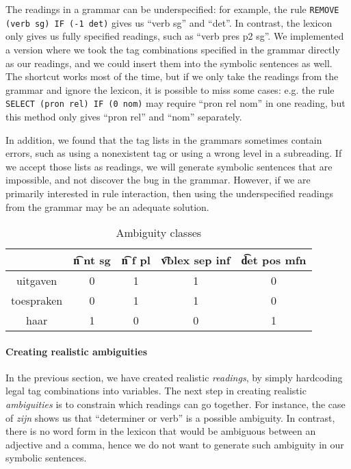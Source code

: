 {{The readings in a grammar can be underspecified: for example, the rule
\texttt{REMOVE (verb sg) IF (-1 det)} gives us ``verb sg'' and ``det''.
In contrast, the lexicon only gives us fully specified readings, such
as ``verb pres p2 sg''. We implemented a version where we took
the tag combinations specified in the grammar directly as our
readings, and we could insert them into the symbolic sentences as well.
The shortcut works most of the time, but if we only take the readings
from the grammar and ignore the lexicon, it is possible to
miss some cases: e.g. the rule \texttt{SELECT (pron rel) IF (0 nom)} 
may require ``pron rel nom'' in one reading, but this method only gives
``pron rel'' and ``nom'' separately. 


In addition, we found that the tag lists in the grammars sometimes
contain errors, such as using a nonexistent tag or using a wrong level
in a subreading. If we accept those lists as readings, we will
generate symbolic sentences that are impossible, and not discover
the bug in the grammar.
However, if we are primarily interested in rule interaction, then using
the underspecified readings from the grammar may be an adequate solution.



\begin{table}[h]
\centering
\begin{tabular}{ c|c|c|c|c}
             & \t{n nt sg}  & \t{n f pl}  & \t{vblex sep inf} & \t{det pos mfn}  \\ \hline
 uitgaven    & 0        & 1       & 1             & 0    \\ 
 toespraken  & 0        & 1       & 1             & 0    \\ 
 haar        & 1        & 0       & 0             & 1    \\ 
\end{tabular}
\caption{Ambiguity classes}
\label{table:ambclass}
\end{table}

\paragraph{Creating realistic ambiguities}


In the previous section, we have created realistic \emph{readings}, by simply hardcoding legal tag combinations into variables. The next step in creating realistic \emph{ambiguities} is to constrain which readings can go together. For instance, the case of \emph{zijn} shows us that ``determiner or verb'' is a possible ambiguity. In contrast, there is no word form in the lexicon that would be ambiguous between an adjective and a comma, hence we do not want to generate such ambiguity in our symbolic sentences.


}}
